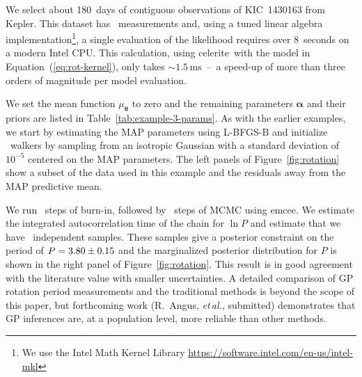 \documentclass[manuscript, letterpaper]{aastex6}
\newcommand{\project}[1]{\textsf{#1}}
\newcommand{\kepler}{\project{Kepler}}
\newcommand{\celerite}{\project{celerite}}
\newcommand{\emcee}{\project{emcee}}
\newcommand{\foreign}[1]{\emph{#1}}
\newcommand{\etal}{\foreign{et\,al.}}
\newcommand{\figureref}[1]{\ref{fig:#1}}
\newcommand{\Figure}[1]{Figure~\figureref{#1}}
\renewcommand{\eqref}[1]{\ref{eq:#1}}
\newcommand{\Eq}[1]{Equation~(\eqref{#1})}
\newcommand{\eq}[1]{\Eq{#1}}
\newcommand{\bvec}[1]{{\ensuremath{\boldsymbol{#1}}}}
\newcommand{\response}[1]{{\color{blue}#1}}
\begin{document}
\response{We select about 180~days of contiguous observations of
KIC~1430163 from \kepler.
This dataset has \exampleiiindata\ measurements and, using a tuned linear
algebra
implementation\footnote{We use the Intel Math Kernel Library
\url{https://software.intel.com/en-us/intel-mkl}}, a
single evaluation of the likelihood requires over 8~seconds on a modern Intel
CPU.
This calculation, using \celerite\ with the model in \eq{rot-kernel}, only
takes $\sim 1.5\,\mathrm{ms}$~--~a speed-up of more than three orders of
magnitude per model evaluation.

We set the mean function $\mu_\bvec{\theta}$ to zero and the remaining
parameters $\bvec{\alpha}$ and their priors are listed in
Table~\ref{tab:example-3-params}.
As with the earlier examples, we start by estimating the MAP parameters using
\project{L-BFGS-B} and initialize \exampleiiinwalkers~walkers by sampling from
an isotropic Gaussian with a standard deviation of $10^{-5}$ centered on the
MAP parameters.
The left panels of \Figure{rotation} show a subset of the data used in this
example and the residuals away from the MAP predictive mean.

We run \exampleiiinburn~steps of burn-in, followed by \exampleiiinsteps~steps
of MCMC using \emcee.
We estimate the integrated autocorrelation time of the chain for $\ln P$ and
estimate that we have \exampleiiineff\ independent samples.
These samples give a posterior constraint on the period of $P =
{3.80 \pm 0.15}$ and the marginalized posterior distribution for $P$ is shown
in the right panel of \Figure{rotation}.
This result is in good agreement with the literature value with smaller
uncertainties.
A detailed comparison of GP rotation period measurements and the traditional
methods is beyond the scope of this paper, but forthcoming work (R.~Angus,
\etal, submitted) demonstrates that GP inferences are, at a population level,
more reliable than other methods.
}


\end{document}
